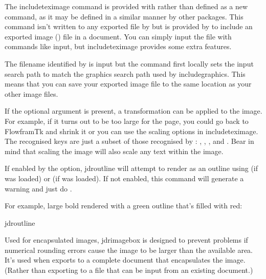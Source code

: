 \documentclass[fontsize=12pt]{scrbook}
\begin{document}

The \gls{includeteximage} command is provided with
rather than defined as a new command, as it may be defined in a similar manner by 
other packages.
This command isn't written to any exported file by 
but is provided by  to include an exported
image () file in a document.  You can simply input the file
with commands like \gls{input}, but \gls{includeteximage} provides
some extra features.

The filename identified by  is input but
the command first locally sets the input search path to match the graphics
search path used by \gls{includegraphics}. This means that you can
save your exported image  file to the same location as your
other image files.

If the optional argument is present, a transformation can be applied
to the image. For example, if it turns out to be too large for the
page, you could go back to \gls{FlowframTk} and shrink it or you
can use the scaling options in \gls{includeteximage}. The recognised
keys are just a subset of those recognised by :
, , , 
and . Bear in mind that scaling the image will also
scale any text within the image.


If enabled by the  option, \gls{jdroutline} will attempt
to render  as an outline using  (if
 was loaded) or  (if
 was loaded). If not enabled, this command will
generate a warning and just do .

For example, large bold  rendered with a green outline
that's filled with red:
\begin{codebox}
\gls{jdroutline}
\end{codebox}


Used for encapsulated images, \gls{jdrimagebox} is designed to prevent
problems if numerical rounding errors cause the image to be larger
than the available area. It's used when  exports to
a complete document that encapsulates the image. (Rather than
exporting to a  file that can be input from an existing document.)
 
\end{document}
